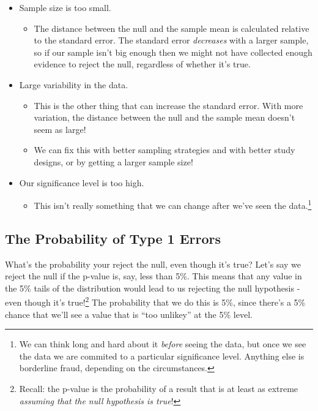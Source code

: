 \documentclass[
  letterpaper,
  DIV=11,
  numbers=noendperiod]{scrreprt}
\providecommand{\tightlist}{%
  \setlength{\itemsep}{0pt}\setlength{\parskip}{0pt}}\usepackage{longtable,booktabs,array}
\begin{document}
\begin{itemize}
\tightlist
\item
  Sample size is too small.

  \begin{itemize}
  \tightlist
  \item
    The distance between the null and the sample mean is calculated
    relative to the standard error. The standard error \emph{decreases}
    with a larger sample, so if our sample isn't big enough then we
    might not have collected enough evidence to reject the null,
    regardless of whether it's true.
  \end{itemize}
\item
  Large variability in the data.

  \begin{itemize}
  \tightlist
  \item
    This is the other thing that can increase the standard error. With
    more variation, the distance between the null and the sample mean
    doesn't seem as large!
  \item
    We can fix this with better sampling strategies and with better
    study designs, or by getting a larger sample size!
  \end{itemize}
\item
  Our significance level is too high.

  \begin{itemize}
  \tightlist
  \item
    This isn't really something that we can change after we've seen the
    data.\footnote{We can think long and hard about it \emph{before}
      seeing the data, but once we see the data we are commited to a
      particular significance level. Anything else is borderline fraud,
      depending on the circumstances.}
  \end{itemize}
\end{itemize}

\hypertarget{the-probability-of-type-1-errors}{%
\subsection{The Probability of Type 1
Errors}\label{the-probability-of-type-1-errors}}

What's the probability your reject the null, even though it's true?
Let's say we reject the null if the p-value is, say, less than 5\%. This
means that any value in the 5\% tails of the distribution would lead to
us rejecting the null hypothesis - even though it's true!\footnote{Recall:
  the p-value is the probability of a result that is at least as extreme
  \emph{assuming that the null hypothesis is true}!} The probability
that we do this is 5\%, since there's a 5\% chance that we'll see a
value that is ``too unlikey'' at the 5\% level.
\end{document}
